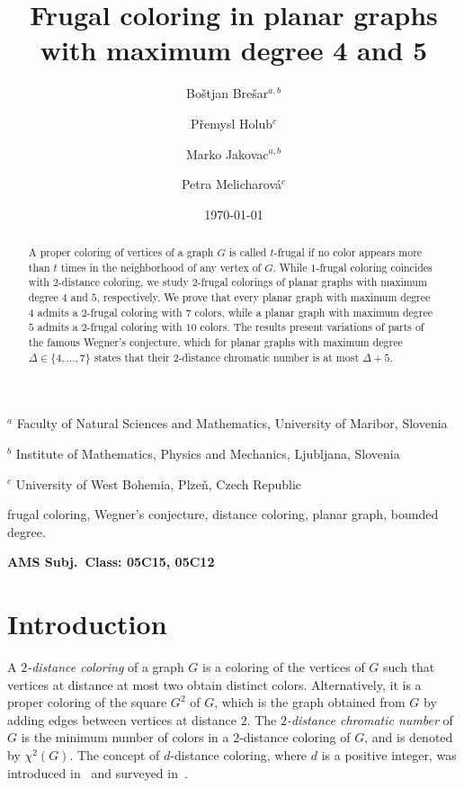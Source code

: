 \documentclass[11pt]{article}
\begin{document}
\title{\Large Frugal coloring in planar graphs with maximum degree 4 and 5}

\author{
Bo\v{s}tjan Bre\v{s}ar$^{a,b}$  \and P\v{r}emysl Holub$^{c}$ \and Marko Jakovac$^{a,b}$ \and Petra Melicharov\' a$^{c}$
}

\date{\today}

\maketitle

\begin{center}
$^a$ Faculty of Natural Sciences and Mathematics, University of Maribor, Slovenia\\
\medskip

$^b$ Institute of Mathematics, Physics and Mechanics, Ljubljana, Slovenia\\
\medskip


$^c$ University of West Bohemia, Plze\v n, Czech Republic
\\

\end{center}

\begin{abstract}
A proper coloring of vertices of a graph $G$ is called $t$-frugal if no color appears more than $t$ times in the neighborhood of any vertex of $G$. While $1$-frugal coloring coincides with $2$-distance coloring, we study $2$-frugal colorings of planar graphs with maximum degree $4$ and $5$, respectively. We prove that every planar graph with maximum degree $4$ admits a $2$-frugal coloring with $7$ colors, while a planar graph with maximum degree $5$ admits a $2$-frugal coloring with $10$ colors. The results present variations of parts of the famous Wegner's conjecture, which for planar graphs with maximum degree $\Delta\in\{4,\ldots,7\}$ states that their $2$-distance chromatic number is at most $\Delta+5$. 
\end{abstract}

 frugal coloring, Wegner's conjecture, distance coloring, planar graph, bounded degree.

\medskip\noindent
{\bf AMS Subj.\ Class: 05C15, 05C12}


\section{Introduction}
\label{sec:intro}

A {\em $2$-distance coloring} of a graph $G$ is a coloring of the vertices of $G$ such that vertices at distance at most two obtain distinct colors. Alternatively, it is a proper coloring of the square $G^2$ of $G$, which is the graph obtained from $G$ by adding edges between vertices at distance $2$. The {\em $2$-distance chromatic number} of $G$ is the minimum number of colors in a $2$-distance coloring of $G$, and is denoted by $\chi^2(G)$.   The concept of $d$-distance coloring, where $d$ is a positive integer, was introduced in~\cite{Kramer_intro} and surveyed in~\cite{Kramer_surv}.  
\end{document}
